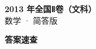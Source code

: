 \documentclass[zihao=-4, a4paper]{ctexart}
\begin{document}
\begin{center}
  {\Large\bfseries 2013 年全国Ⅱ卷（文科）}\\[4pt]
  {\large 数学 · 简答版}
\end{center}
\medskip
{}

\clearpage
{}
\begin{center}{\Large\bfseries 答案速查}\end{center}
\medskip

\end{document}
